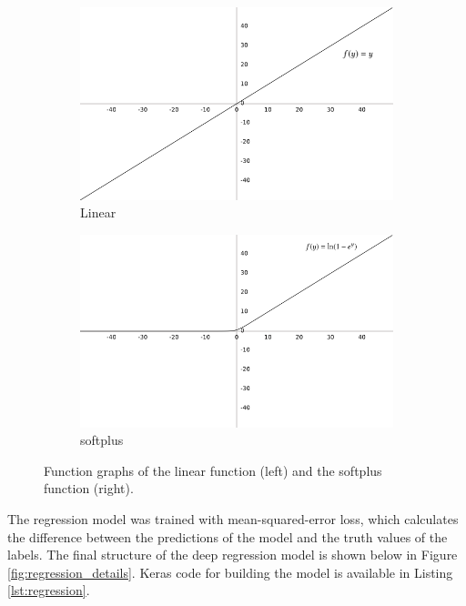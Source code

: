\begin{figure}[h]
    \centering
    \begin{subfigure}{0.45\textwidth}
        \includegraphics[width=\textwidth]{dissertation/figures/linear_function.png}
        \caption{Linear}
    \end{subfigure}
    \begin{subfigure}{0.45\textwidth}
        \includegraphics[width=\textwidth]{dissertation/figures/softplus_function.png}
        \caption{softplus}
    \end{subfigure}
    \caption{Function graphs of the linear function (left) and the softplus function (right).}
    \label{fig:linear_softplus}
\end{figure}

The regression model was trained with mean-squared-error loss, which calculates the difference between the predictions of the model and the truth values of the labels. The final structure of the deep regression model is shown below in Figure \ref{fig:regression_details}. Keras code for building the model is available in Listing \ref{lst:regression}.

